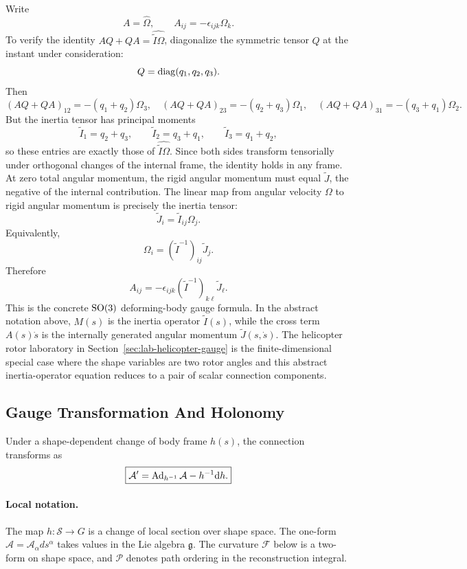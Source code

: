 \begin{derivation}
Write
\[
  A=\widehat\Omega,\qquad A_{ij}=-\epsilon_{ijk}\Omega_k.
\]
To verify the identity \(AQ+QA=\widehat{\widetilde I\Omega}\), diagonalize the
symmetric tensor \(Q\) at the instant under consideration:
\[
  Q=\operatorname{diag}(q_1,q_2,q_3).
\]
Then
\[
  (AQ+QA)_{12}=-(q_1+q_2)\Omega_3,\quad
  (AQ+QA)_{23}=-(q_2+q_3)\Omega_1,\quad
  (AQ+QA)_{31}=-(q_3+q_1)\Omega_2.
\]
But the inertia tensor has principal moments
\[
  \widetilde I_1=q_2+q_3,\qquad
  \widetilde I_2=q_3+q_1,\qquad
  \widetilde I_3=q_1+q_2,
\]
so these entries are exactly those of
\(\widehat{\widetilde I\Omega}\). Since both sides transform tensorially under
orthogonal changes of the internal frame, the identity holds in any frame.
At zero total angular momentum, the rigid angular momentum must equal
\(\widetilde J\), the negative of the internal contribution. The linear map
from angular velocity \(\Omega\) to rigid angular momentum is precisely the
inertia tensor:
\[
  \widetilde J_i=\widetilde I_{ij}\Omega_j.
\]
Equivalently,
\[
  \Omega_i=(\widetilde I^{-1})_{ij}\widetilde J_j.
\]
Therefore
\[
  \boxed{
  A_{ij}
  =
  -\epsilon_{ijk}
  (\widetilde I^{-1})_{k\ell}\widetilde J_\ell.
  }
\]
This is the concrete \(\operatorname{SO}(3)\) deforming-body gauge formula. In the abstract
notation above, \(M(s)\) is the inertia operator
\(\widetilde I(s)\), while the cross term \(A(s)\dot s\) is the internally
generated angular momentum \(\widetilde J(s,\dot s)\). The helicopter rotor
laboratory in Section~\ref{sec:lab-helicopter-gauge} is the finite-dimensional
special case where the shape variables are two rotor angles and this abstract
inertia-operator equation reduces to a pair of scalar connection components.
\end{derivation}

\subsection{Gauge Transformation And Holonomy}
\label{subsec:gauge-holonomy}

Under a shape-dependent change of body frame \(h(s)\), the connection transforms
as
\[
  \boxed{
  \mathcal A'
  =
  \operatorname{Ad}_{h^{-1}}\mathcal A-h^{-1}\mathrm{d} h.
  }
\]

\paragraph{Local notation.}
The map \(h:\mathcal S\to G\) is a change of local section over shape space.
The one-form \(\mathcal A=\mathcal A_\alpha ds^\alpha\) takes values in the Lie
algebra \(\mathfrak g\).  The curvature \(\mathcal F\) below is a two-form on
shape space, and \(\mathcal P\) denotes path ordering in the reconstruction
integral.


